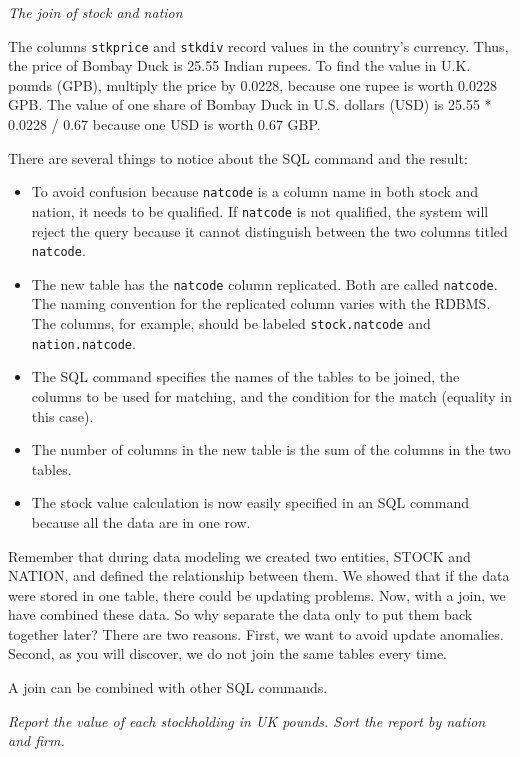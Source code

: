 \documentclass[
]{article}
\begin{document}
\emph{The join of stock and nation}

The columns \texttt{stkprice} and \texttt{stkdiv} record values in the
country's currency. Thus, the price of Bombay Duck is 25.55 Indian
rupees. To find the value in U.K. pounds (GPB), multiply the price by
0.0228, because one rupee is worth 0.0228 GPB. The value of one share of
Bombay Duck in U.S. dollars (USD) is 25.55 * 0.0228 / 0.67 because one
USD is worth 0.67 GBP.

There are several things to notice about the SQL command and the result:

\begin{itemize}
\item
  To avoid confusion because \texttt{natcode} is a column name in both
  stock and nation, it needs to be qualified. If \texttt{natcode} is not
  qualified, the system will reject the query because it cannot
  distinguish between the two columns titled \texttt{natcode}.
\item
  The new table has the \texttt{natcode} column replicated. Both are
  called \texttt{natcode}. The naming convention for the replicated
  column varies with the RDBMS. The columns, for example, should be
  labeled \texttt{stock.natcode} and \texttt{nation.natcode}.
\item
  The SQL command specifies the names of the tables to be joined, the
  columns to be used for matching, and the condition for the match
  (equality in this case).
\item
  The number of columns in the new table is the sum of the columns in
  the two tables.
\item
  The stock value calculation is now easily specified in an SQL command
  because all the data are in one row.
\end{itemize}

Remember that during data modeling we created two entities, STOCK and
NATION, and defined the relationship between them. We showed that if the
data were stored in one table, there could be updating problems. Now,
with a join, we have combined these data. So why separate the data only
to put them back together later? There are two reasons. First, we want
to avoid update anomalies. Second, as you will discover, we do not join
the same tables every time.

A join can be combined with other SQL commands.

\emph{Report the value of each stockholding in UK pounds. Sort the
report by nation and firm.}
\end{document}
